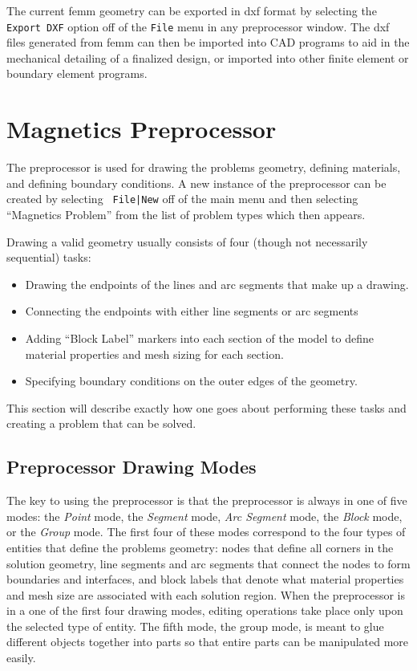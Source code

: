 \documentclass[12pt]{report}
\begin{document}
The current femm geometry can be exported in dxf format by
selecting the \texttt{Export DXF} option off of the \texttt{File}
menu in any preprocessor window. The dxf files generated from femm
can then be imported into CAD programs to aid in the mechanical
detailing of a finalized design, or imported into other finite
element or boundary element programs.

\section{Magnetics Preprocessor}

The preprocessor is used for drawing the problems geometry,
defining materials, and defining boundary conditions. A new
instance of the preprocessor can be created by selecting {\tt
File|New} off of the main menu and then selecting ``Magnetics
Problem'' from the list of problem types which then appears.

Drawing a valid geometry usually consists of four (though not
necessarily sequential) tasks:
\begin{itemize}
\item Drawing the endpoints of the lines and arc segments that
make up a drawing.
\item Connecting the endpoints with either line segments or arc
segments
\item Adding ``Block Label'' markers into each section of the
model to define material properties and mesh sizing for each
section.
\item Specifying boundary conditions on the outer edges of the
geometry.
\end{itemize}
This section will describe exactly how one goes about performing
these tasks and creating a problem that can be solved.

\subsection{Preprocessor Drawing Modes} \label{pencil}

The key to using the preprocessor is that the preprocessor is
always in one of five modes: the {\em Point} mode, the {\em
Segment} mode, {\em Arc Segment} mode, the {\em Block} mode, or the
{\em Group} mode. The first four of these modes correspond to the
four types of entities that define the problems geometry: nodes
that define all corners in the solution geometry, line segments and
arc segments that connect the nodes to form boundaries and
interfaces, and block labels that denote what material properties
and mesh size are associated with each solution region. When the
preprocessor is in a one of the first four drawing modes, editing
operations take place only upon the selected type of entity.  The
fifth mode, the group mode, is meant to glue different objects
together into parts so that entire parts can be manipulated more
easily.
\end{document}
